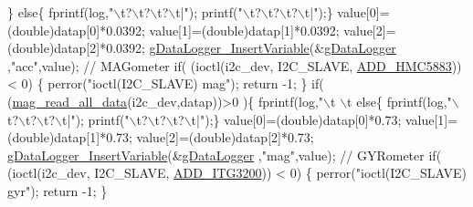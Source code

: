 \begin{DoxyCode}
{{{      \}
      \textcolor{keywordflow}{else}\{
        fprintf(log,\textcolor{stringliteral}{"\(\backslash\)t?\(\backslash\)t?\(\backslash\)t?\(\backslash\)t|"}); printf(\textcolor{stringliteral}{"\(\backslash\)t?\(\backslash\)t?\(\backslash\)t?\(\backslash\)t|"});\}
      value[0]=(double)datap[0]*0.0392;
      value[1]=(double)datap[1]*0.0392;
      value[2]=(double)datap[2]*0.0392;
      \hyperlink{gdatalogger_8c_a32674e7c2afa8b78e99a0070cf4bcaf9}{gDataLogger\_InsertVariable}(&\hyperlink{datalogger_01_07Caio-PC's_01conflicted_01copy_012012-11-23_08_8c_abe3b9c2c4e21e79c7b046b5986d13acc}{gDataLogger}
      ,\textcolor{stringliteral}{"acc"},value);
  \textcolor{comment}{// MAGometer    }
      \textcolor{keywordflow}{if}( (ioctl(i2c\_dev, I2C\_SLAVE, \hyperlink{imu__functions_01_07C_xC3_xB3pia_01em_01conflito_01de_01Andr_xC3_xA9_01Carvalho_012013-04-26_08_8h_a383c09d3e3bbe30097f7eb8d081fb856}{ADD\_HMC5883})) < 0) \{
        perror(\textcolor{stringliteral}{"ioctl(I2C\_SLAVE) mag"});
        \textcolor{keywordflow}{return} -1;
      \} 
      \textcolor{keywordflow}{if}( (\hyperlink{imu__functions_01_07C_xC3_xB3pia_01em_01conflito_01de_01Andr_xC3_xA9_01Carvalho_012013-04-26_08_8h_a8f2fd896caf1216ba82e535e6251692f}{mag\_read\_all\_data}(i2c\_dev,datap))>0 )\{
        fprintf(log,\textcolor{stringliteral}{"\(\backslash\)t%
      \(\backslash\)t%
      \textcolor{keywordflow}{else}\{
        fprintf(log,\textcolor{stringliteral}{"\(\backslash\)t?\(\backslash\)t?\(\backslash\)t?\(\backslash\)t|"}); printf(\textcolor{stringliteral}{"\(\backslash\)t?\(\backslash\)t?\(\backslash\)t?\(\backslash\)t|"});\}
      value[0]=(double)datap[0]*0.73;
      value[1]=(double)datap[1]*0.73;
      value[2]=(double)datap[2]*0.73;
      \hyperlink{gdatalogger_8c_a32674e7c2afa8b78e99a0070cf4bcaf9}{gDataLogger\_InsertVariable}(&\hyperlink{datalogger_01_07Caio-PC's_01conflicted_01copy_012012-11-23_08_8c_abe3b9c2c4e21e79c7b046b5986d13acc}{gDataLogger}
      ,\textcolor{stringliteral}{"mag"},value);
  \textcolor{comment}{// GYRometer    }
      \textcolor{keywordflow}{if}( (ioctl(i2c\_dev, I2C\_SLAVE, \hyperlink{imu__functions_01_07C_xC3_xB3pia_01em_01conflito_01de_01Andr_xC3_xA9_01Carvalho_012013-04-26_08_8h_ab9fd1068a3f5fcba24d92918aaf0dcb5}{ADD\_ITG3200})) < 0) \{
        perror(\textcolor{stringliteral}{"ioctl(I2C\_SLAVE) gyr"});
        \textcolor{keywordflow}{return} -1;
      \} 
}}}}
\end{DoxyCode}
